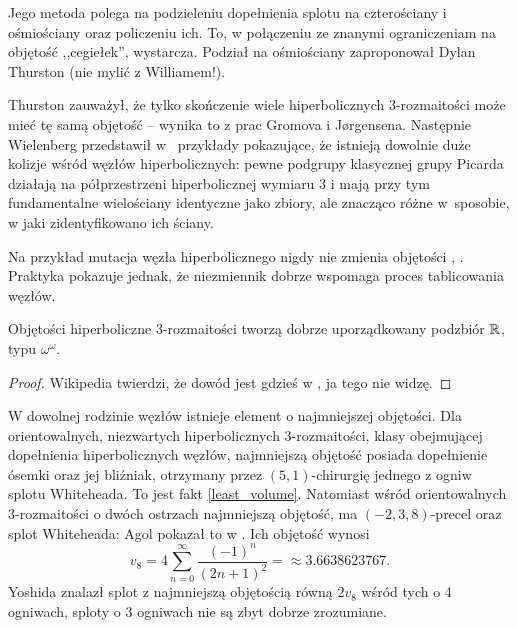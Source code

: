 Jego metoda polega na podzieleniu dopełnienia splotu na czterościany i ośmiościany oraz policzeniu ich.
To, w połączeniu ze znanymi ograniczeniam na objętość ,,cegiełek'', wystarcza.
Podział na ośmiościany zaproponował Dylan Thurston (nie mylić z Williamem!).


Thurston zauważył, że tylko skończenie wiele hiperbolicznych 3-rozmaitości może mieć tę samą objętość -- wynika to z prac Gromova i Jørgensena.
Następnie Wielenberg przedstawił w~\cite{wielenberg81} przykłady pokazujące, że istnieją dowolnie duże kolizje wśród węzłów hiperbolicznych: pewne podgrupy klasycznej grupy Picarda działają  na półprzestrzeni hiperbolicznej wymiaru 3 i mają przy tym fundamentalne wielościany identyczne jako zbiory, ale znacząco różne w~sposobie, w jaki zidentyfikowano ich ściany.

Na przykład mutacja węzła hiperbolicznego nigdy nie zmienia objętości \cite{ruberman87}, \cite[s. 124]{adams94}.
Praktyka pokazuje jednak, że niezmiennik dobrze wspomaga proces tablicowania węzłów.

\begin{proposition}
    Objętości hiperboliczne 3-rozmaitości tworzą dobrze uporządkowany podzbiór $\mathbb R$, typu $\omega^\omega$.
\end{proposition}

\begin{proof}
    Wikipedia twierdzi, że dowód jest gdzieś w \cite{neumann85}, ja tego nie widzę.
\end{proof}

W dowolnej rodzinie węzłów istnieje element o najmniejszej objętości.
Dla orientowalnych, niezwartych hiperbolicznych 3-rozmaitości, klasy obejmującej dopełnienia hiperbolicznych węzłów, najmniejszą objętość posiada dopełnienie ósemki oraz jej bliźniak, otrzymany przez $(5, 1)$-chirurgię jednego z ogniw splotu Whiteheada.
To jest fakt \ref{least_volume}.
Natomiast wśród orientowalnych 3-rozmaitości o dwóch ostrzach najmniejszą objętość, ma $(-2, 3, 8)$-precel oraz splot Whiteheada: Agol pokazał to w \cite{agol10}.
Ich objętość wynosi
\begin{equation}
    v_8 = 4 \sum_{n=0}^\infty \frac{(-1)^n}{(2n+1)^2} = \approx 3.6638623767. %
\end{equation}
Yoshida \cite{yoshida13} znalazł splot z najmniejszą objętością równą $2v_8$ wśród tych o 4 ogniwach, sploty o 3 ogniwach nie są zbyt dobrze zrozumiane.


